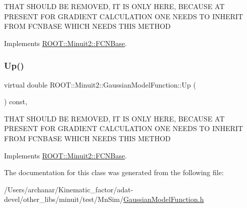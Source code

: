 T\+H\+AT S\+H\+O\+U\+LD BE R\+E\+M\+O\+V\+ED, IT IS O\+N\+LY H\+E\+RE, B\+E\+C\+A\+U\+SE AT P\+R\+E\+S\+E\+NT F\+OR G\+R\+A\+D\+I\+E\+NT C\+A\+L\+C\+U\+L\+A\+T\+I\+ON O\+NE N\+E\+E\+DS TO I\+N\+H\+E\+R\+IT F\+R\+OM F\+C\+N\+B\+A\+SE W\+H\+I\+CH N\+E\+E\+DS T\+H\+IS M\+E\+T\+H\+OD 

Implements \mbox{\hyperlink{classROOT_1_1Minuit2_1_1FCNBase_a04ef08ddad92ce8d89d498efbe021c39}{R\+O\+O\+T\+::\+Minuit2\+::\+F\+C\+N\+Base}}.

\mbox{\label{classROOT_1_1Minuit2_1_1GaussianModelFunction_ae99a5c50055e4563a2252ba8ceb19d20}} 
\subsubsection{\texorpdfstring{Up()}{Up()}\hspace{0.1cm}{\footnotesize\ttfamily [2/2]}}
{\footnotesize\ttfamily virtual double R\+O\+O\+T\+::\+Minuit2\+::\+Gaussian\+Model\+Function\+::\+Up (\begin{DoxyParamCaption}{ }\end{DoxyParamCaption}) const\hspace{0.3cm}{\ttfamily [inline]}, {\ttfamily [virtual]}}

T\+H\+AT S\+H\+O\+U\+LD BE R\+E\+M\+O\+V\+ED, IT IS O\+N\+LY H\+E\+RE, B\+E\+C\+A\+U\+SE AT P\+R\+E\+S\+E\+NT F\+OR G\+R\+A\+D\+I\+E\+NT C\+A\+L\+C\+U\+L\+A\+T\+I\+ON O\+NE N\+E\+E\+DS TO I\+N\+H\+E\+R\+IT F\+R\+OM F\+C\+N\+B\+A\+SE W\+H\+I\+CH N\+E\+E\+DS T\+H\+IS M\+E\+T\+H\+OD 

Implements \mbox{\hyperlink{classROOT_1_1Minuit2_1_1FCNBase_a04ef08ddad92ce8d89d498efbe021c39}{R\+O\+O\+T\+::\+Minuit2\+::\+F\+C\+N\+Base}}.



The documentation for this class was generated from the following file\+:\begin{DoxyCompactItemize}
\item 
/\+Users/archanar/\+Kinematic\+\_\+factor/adat-\/devel/other\+\_\+libs/minuit/test/\+Mn\+Sim/\mbox{\hyperlink{adat-devel_2other__libs_2minuit_2test_2MnSim_2GaussianModelFunction_8h}{Gaussian\+Model\+Function.\+h}}\end{DoxyCompactItemize}
